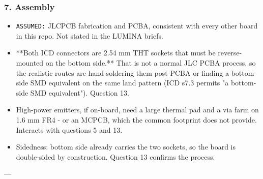 \documentclass[11pt,a4paper]{article}
\begin{document}
\subsubsection*{7. Assembly}
\begin{itemize}
\item \texttt{ASSUMED:} JLCPCB fabrication and PCBA, consistent with every other board in
this repo. Not stated in the LUMINA briefs.
\item {*}{*}Both ICD connectors are 2.54 mm THT sockets that must be reverse-mounted on
the bottom side.{*}{*} That is not a normal JLC PCBA process, so the realistic
routes are hand-soldering them post-PCBA or finding a bottom-side SMD
equivalent on the same land pattern (ICD s7.3 permits "a bottom-side SMD
equivalent"). Question 13.
\item High-power emitters, if on-board, need a large thermal pad and a via farm on
1.6 mm FR4 - or an MCPCB, which the common footprint does not provide.
Interacts with questions 5 and 13.
\item Sidedness: bottom side already carries the two sockets, so the board is
double-sided by construction. Question 13 confirms the process.
\end{itemize}
---
\end{document}
